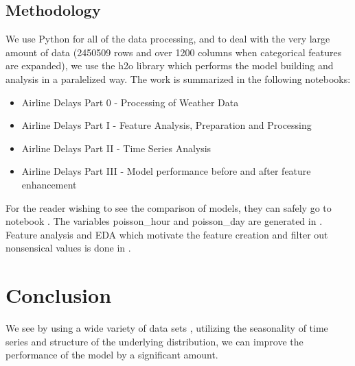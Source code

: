 \documentclass[twocolumn,showpacs,%
  nofootinbib,aps,superscriptaddress,%
  eqsecnum,prd,notitlepage,showkeys,10pt]{revtex4-1}
\begin{document}
\subsection{Methodology}\label{sub:methodology}

We use Python for all of the data processing, and to deal with the very large amount of data (2450509 rows and over 1200 columns when categorical features are expanded), we use the h2o library which performs the model building and analysis in a paralelized way. The work is summarized
in the following notebooks:

\begin{itemize}
\item Airline Delays Part 0 - Processing of Weather Data  \cite{airline1}
\item Airline Delays Part I - Feature Analysis, Preparation and Processing \cite{airline2}
\item Airline Delays Part II - Time Series Analysis \cite{airline3}
\item Airline Delays Part III - Model performance before and after feature enhancement \cite{airline4}
\end{itemize}

For the reader wishing to see the comparison of models, they can safely go to notebook \cite{airline4}. The variables poisson\_hour and poisson\_day are generated in \cite{airline3}. Feature analysis and EDA
which motivate the feature creation and filter out nonsensical values is done in \cite{airline2}. 




\section{Conclusion}

We see by using a wide variety of data sets , utilizing the seasonality of time series and structure of the underlying distribution, we can improve the performance of the model by a significant amount.
\end{document}
